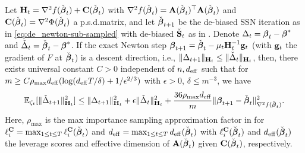 \documentclass[11pt,a4paper]{article}
\begin{document}
\begin{lemma}\label{lemm:pre_convergence}
Let $\H_t=\nabla^2f(\check{\bbeta}_{t})+\C(\check{\bbeta}_t)$ with  $\nabla^2f(\check{\bbeta}_{t})=\A(\check{\bbeta}_t)^\top \A(\check{\bbeta}_t)$  and $\C(\check{\bbeta}_t)=\nabla^2\Phi(\check{\bbeta}_t)$ a p.s.d.\@ matrix, and let $\check{\bbeta}_{t+1}$ be the de-biased SSN iteration as in \eqref{eq:de_newton-sub-sampled} with de-biased $\check \S_t$ as in .  
Denote $\Delta_{t}=\bbeta_{t}-\bbeta^{\ast}$ and $\check{\Delta}_{t}=\check{\bbeta}_t-\bbeta^{\ast}$. If the exact Newton step $\bbeta_{t+1}=\check{\bbeta}_t-\mu_t\H^{-1}_t\g_t$ (with $\g_t$ the gradient of $F$ at $\check\bbeta_t$) is a descent direction, i.e., $\|\Delta_{t+1}\|_{\H_t}\leq \|\check{\Delta}_{t}\|_{\H_t}$, then, there exists universal constant $C > 0$ independent of $n, d_{\eff}$ such that for $m\geq C\rho_{\max} d_{\eff}(\log(d_{\eff}T/\delta )+ 1/\epsilon^{2/3}) $ with $\epsilon > 0$, $\delta\leq m^{-3}$, 
we have
 \begin{align}
   \EE_{\zeta_t}[\|\check{\Delta}_{t+1}\|^2_{\H_t}] \leq \|\Delta_{t+1}\|^2_{\H_t} +\epsilon\|\check{\Delta}_{t}\|^2_{\H_t}+\frac{36\rho_{\max}  d_{\eff}}{m}\|\bbeta_{t+1}-\check{\bbeta}_t\|^2_{\nabla^2f(\check{\bbeta}_{t})}.\nonumber
\end{align} 
Here, $\rho_{\max}$ is the max importance sampling approximation factor in  for $\ell_{i}^\C=\max_{1\leq t \leq T}\ell_{i}^\C(\check{\bbeta}_t)$ and $d_{\eff}=\max_{1\leq t \leq T}d_{\eff}(\check{\bbeta}_t)$ with $\ell_{i}^\C(\check{\bbeta}_t)$ and $d_{\eff}(\check{\bbeta}_t)$ the leverage scores and effective dimension of $\A(\check{\bbeta}_t)$ given $\C(\check{\bbeta}_t)$, respectively.
\end{lemma}
\end{document}

